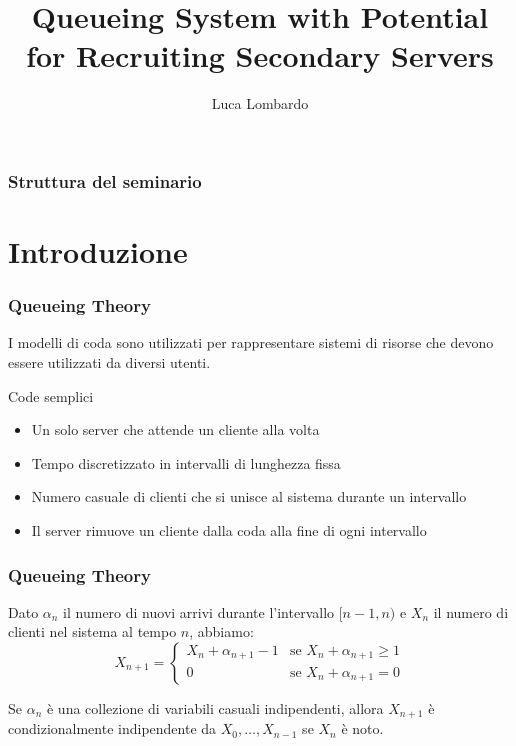 \documentclass{beamer}
\title{Queueing System with Potential for Recruiting Secondary Servers}
\author{Luca Lombardo}
\institute{Seminario per Metodi Numerici per Catene di Markov}
\date{}
\begin{document}
\frame{\titlepage}


\begin{frame}
    \frametitle{Struttura del seminario}
    \tableofcontents
\end{frame}

\section{Introduzione}
\begin{frame}
    \frametitle{Queueing Theory}
        I modelli di coda sono utilizzati per rappresentare sistemi di risorse che devono essere utilizzati da diversi utenti.
    \begin{block}{Code semplici}
        \begin{itemize}
            \item Un solo server che attende un cliente alla volta
            \item Tempo discretizzato in intervalli di lunghezza fissa
            \item Numero casuale di clienti che si unisce al sistema durante un intervallo
            \item Il server rimuove un cliente dalla coda alla fine di ogni intervallo
        \end{itemize}
    \end{block}
\end{frame}


\begin{frame}
\frametitle{Queueing Theory}
Dato $\alpha_n$ il numero di nuovi arrivi durante l'intervallo $[n - 1, n)$ e $X_n$ il numero di clienti nel sistema al tempo $n$, abbiamo:
\begin{equation*}
    X_{n+1} =
    \begin{cases}
        X_n + \alpha_{n+1} - 1 & \text{se } X_n + \alpha_{n+1} \geq 1 \\
        0 & \text{se } X_n + \alpha_{n+1} = 0
    \end{cases}
\end{equation*}
\begin{block}{}
    Se ${\alpha_n}$ è una collezione di variabili casuali indipendenti, allora $X_{n+1}$ è condizionalmente indipendente da $X_0, \ldots, X_{n-1}$ se $X_n$ è noto.
\end{block}
\end{frame}
\end{document}
